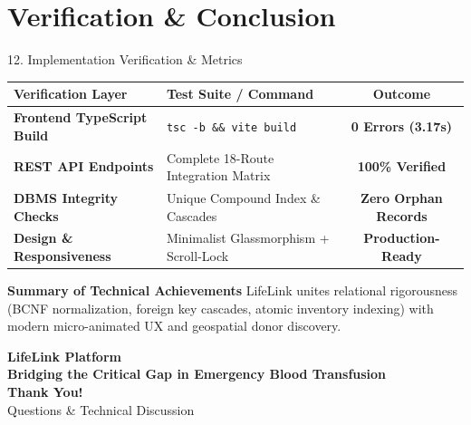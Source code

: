 \documentclass[aspectratio=169,10pt]{beamer}
\begin{document}
\section{Verification \& Conclusion}

\begin{frame}{12. Implementation Verification \& Metrics}
    \begin{table}[H]
        \centering
        \small
        \begin{tabular}{llc}
            \toprule
            \textbf{Verification Layer} & \textbf{Test Suite / Command} & \textbf{Outcome} \\
            \midrule
            \textbf{Frontend TypeScript Build} & \texttt{tsc -b \&\& vite build} & \textbf{0 Errors (3.17s)} \\
            \textbf{REST API Endpoints} & Complete 18-Route Integration Matrix & \textbf{100\% Verified} \\
            \textbf{DBMS Integrity Checks} & Unique Compound Index \& Cascades & \textbf{Zero Orphan Records} \\
            \textbf{Design \& Responsiveness} & Minimalist Glassmorphism + Scroll-Lock & \textbf{Production-Ready} \\
            \bottomrule
        \end{tabular}
    \end{table}

    \begin{exampleblock}{\textbf{Summary of Technical Achievements}}
        \scriptsize LifeLink unites relational rigorousness (BCNF normalization, foreign key cascades, atomic inventory indexing) with modern micro-animated UX and geospatial donor discovery.
    \end{exampleblock}
\end{frame}

\begin{frame}
    \begin{center}
        \vspace{1.0cm}
        {\Huge \textbf{\textcolor{MedicalRed}{LifeLink Platform}}} \\[0.3cm]
        {\large \textbf{Bridging the Critical Gap in Emergency Blood Transfusion}} \\[0.8cm]
        \textbf{Thank You!} \\[0.4cm]
        {\small Questions \& Technical Discussion}
    \end{center}
\end{frame}
\end{document}
